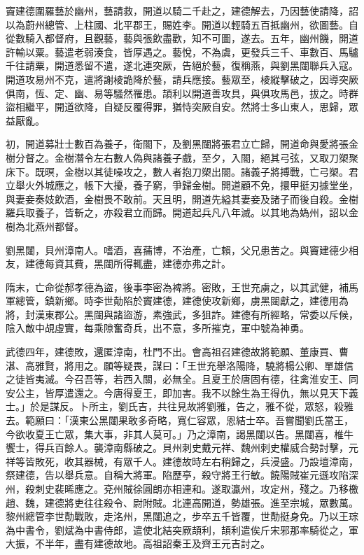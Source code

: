 \begin{pinyinscope}
 竇建德圍羅藝於幽州，藝請救，開道以騎二千赴之，建德解去，乃因藝使請降，詔以為蔚州總管、上柱國、北平郡王，賜姓李。開道以輕騎五百抵幽州，欲圖藝。自從數騎入都督府，且觀藝，藝與張飲盡歡，知不可圖，遂去。五年，幽州饑，開道許輸以粟。藝遣老弱湊食，皆厚遇之。藝悅，不為虞，更發兵三千、車數百、馬驢千往請粟，開道悉留不遣，遂北連突厥，告絕於藝，復稱燕，與劉黑闥聯兵入寇。開道攻易州不克，遣將謝棱詭降於藝，請兵應接。藝眾至，棱縱擊破之，因導突厥俱南，恆、定、幽、易等騷然罹患。頡利以開道善攻具，與俱攻馬邑，拔之。時群盜相繼平，開道欲降，自疑反覆得罪，猶恃突厥自安。然將士多山東人，思歸，眾益厭亂。



 初，開道募壯士數百為養子，衛閤下，及劉黑闥將張君立亡歸，開道命與愛將張金樹分督之。金樹潛令左右數人偽與諸養子戲，至夕，入閤，絕其弓弦，又取刀槊聚床下。既暝，金樹以其徒噪攻之，數人者抱刀槊出閤。諸義子將搏戰，亡弓槊。君立舉火外城應之，帳下大擾，養子窮，爭歸金樹。開道顧不免，擐甲挺刃據堂坐，與妻妾奏妓飲酒，金樹畏不敢前。天且明，開道先縊其妻妾及諸子而後自殺。金樹羅兵取養子，皆斬之，亦殺君立而歸。開道起兵凡八年滅。以其地為媯州，詔以金樹為北燕州都督。



 劉黑闥，貝州漳南人。嗜酒，喜蒱博，不治產，亡賴，父兄患苦之。與竇建德少相友，建德每資其費，黑闥所得輒盡，建德亦弗之計。



 隋末，亡命從郝孝德為盜，後事李密為裨將。密敗，王世充虜之，以其武健，補馬軍總管，鎮新鄉。時李世勣陷於竇建德，建德使攻新鄉，虜黑闥獻之，建德用為將，封漢東郡公。黑闥與諸盜游，素強武，多狙詐。建德有所經略，常委以斥候，陰入敵中覘虛實，每乘隙奮奇兵，出不意，多所摧克，軍中號為神勇。



 武德四年，建德敗，還匿漳南，杜門不出。會高祖召建德故將範願、董康買、曹湛、高雅賢，將用之。願等疑畏，謀曰：「王世充舉洛陽降，驍將楊公卿、單雄信之徒皆夷滅。今召吾等，若西入關，必無全。且夏王於唐固有德，往禽淮安王、同安公主，皆厚遣還之。今唐得夏王，即加害。我不以餘生為王得仇，無以見天下義士。」於是謀反。卜所主，劉氏吉，共往見故將劉雅，告之，雅不從，眾怒，殺雅去。範願曰：「漢東公黑闥果敢多奇略，寬仁容眾，恩結士卒。吾嘗聞劉氏當王，今欲收夏王亡眾，集大事，非其人莫可。」乃之漳南，謁黑闥以告。黑闥喜，椎牛饗士，得兵百餘人。襲漳南縣破之。貝州刺史戴元祥、魏州刺史權威合勢討擊，元祥等皆敗死，收其器械，有眾千人。建德故時左右稍歸之，兵浸盛。乃設壇漳南，祭建德，告以舉兵意。自稱大將軍。陷歷亭，殺守將王行敏。饒陽賊崔元遜攻陷深州，殺刺史裴晞應之。兗州賊徐圓朗亦相連和。遂取瀛州，攻定州，殘之。乃移檄趙、魏，建德將吏往往殺令、尉附賊。北連高開道，勢雄張。進至宗城，眾數萬。黎州總管李世勣戰敗，走洺州，黑闥追之，步卒五千皆覆，世勣挺身免。乃以王琮為中書令，劉斌為中書侍郎，遣使北結突厥頡利，頡利遣俟斤宋邪那率騎從之，軍大振，不半年，盡有建德故地。高祖詔秦王及齊王元吉討之。




\end{pinyinscope}
